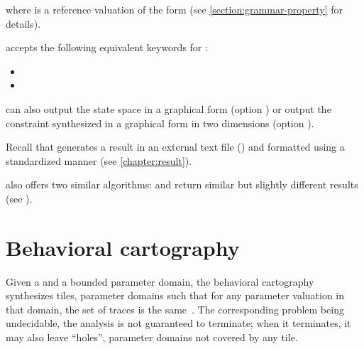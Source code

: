 
\noindent{}
where  is a reference valuation of the form  (see \cref{section:grammar-property} for details).

\begin{syntaxalias}
	\imitator{} accepts the following equivalent keywords for :
	\begin{itemize}
		\item {}
		\item {}
	\end{itemize}
\end{syntaxalias}


\imitator{} can also output the state space in a graphical form (option )
or
output the constraint synthesized in a graphical form in two dimensions (option ).

Recall that \imitator{} %
generates
a result in an external text file () and formatted using a standardized manner (see \cref{chapter:result}). %


\imitator{} also offers two similar algorithms:  and  return similar but slightly different results (see \cite{AS11}).


\section{Behavioral cartography}\label{ss:mode:BC}

Given a \NIPTA{} and a bounded parameter domain, the behavioral cartography~\BC{} synthesizes tiles, \ie{} parameter domains such that for any parameter valuation in that domain, the set of traces is the same~\cite{AF10}.
The corresponding problem being undecidable, the analysis is not guaranteed to terminate; when it terminates, it may also leave ``holes'', \ie{} parameter domains not covered by any tile.

